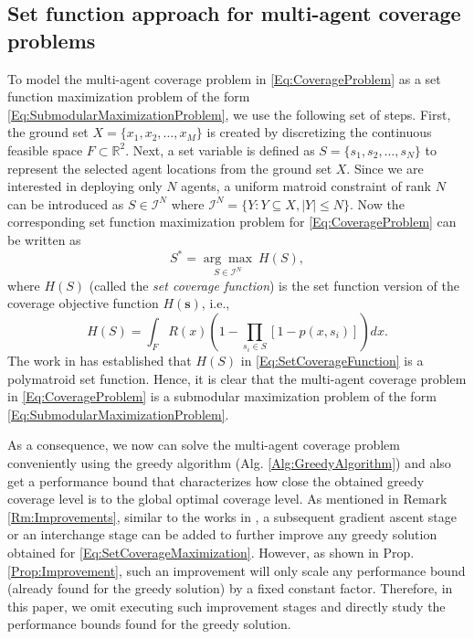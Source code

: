 \documentclass[conference]{IEEEtran}
\newcommand{\R}{\mathbb{R}}
\begin{document}
\subsection{Set function approach for multi-agent coverage problems}

To model the multi-agent coverage problem in \eqref{Eq:CoverageProblem} as a set function maximization problem of the form \eqref{Eq:SubmodularMaximizationProblem}, we use the following set of steps. First, the ground set $X=\{x_1,x_2,\ldots,x_M\}$ is created by discretizing the continuous feasible space $F \subset \R^2$. Next, a set variable is defined as $S = \{s_1,s_2,\ldots,s_N\}$ to represent the selected agent locations from the ground set $X$. Since we are interested in deploying only $N$ agents, a uniform matroid constraint of rank $N$ can be introduced as $S\in\mathcal{I}^N$ where $\mathcal{I}^N = \{Y:Y \subseteq X, \vert Y \vert \leq N\}$. Now the corresponding set function maximization problem for \eqref{Eq:CoverageProblem} can be written as 
\begin{equation}\label{Eq:SetCoverageMaximization}
    S^* = \underset{S\in\mathcal{I}^N}{\arg\max}\ H(S),
\end{equation}
where $H(S)$ (called the \emph{set coverage function}) is the set function version of the coverage objective function $H(\textbf{s})$, i.e., 
\begin{equation}\label{Eq:SetCoverageFunction}
    H(S) = \int_F R(x)(1-\prod_{s_i \in S} \left[1-p(x,s_i)\right])dx.
\end{equation}
The work in \cite{Sun2019} has established that $H(S)$ in \eqref{Eq:SetCoverageFunction} is a polymatroid set function. Hence, it is clear that the multi-agent coverage problem in \eqref{Eq:CoverageProblem} is a submodular maximization problem of the form \eqref{Eq:SubmodularMaximizationProblem}. 

As a consequence, we now can solve the multi-agent coverage problem conveniently using the greedy algorithm (Alg. \ref{Alg:GreedyAlgorithm}) and also get a performance bound that characterizes how close the obtained greedy coverage level is to the global optimal coverage level. As mentioned in Remark \ref{Rm:Improvements}, similar to the works in \cite{Sun2019,Sun2020}, a subsequent gradient ascent stage or an interchange stage can be added to further improve any greedy solution obtained for \eqref{Eq:SetCoverageMaximization}. However, as shown in Prop. \ref{Prop:Improvement}, such an improvement will only scale any performance bound (already found for the greedy solution) by a fixed constant factor. Therefore, in this paper, we omit executing such improvement stages and directly study the performance bounds found for the greedy solution. 
\end{document}
